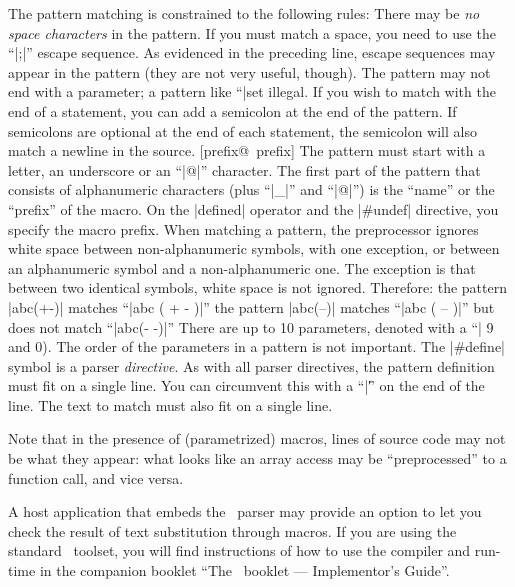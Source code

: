 The pattern matching is constrained to the following rules:
\beginlist{1em}\compactlist
\list{\lbullet}
  There may be {\it no space characters\/} in the pattern. If you must match a space,
  you need to use the ``|;|'' escape sequence.
\list{\lbullet}
  As evidenced in the preceding line, escape sequences may appear in the
  pattern (they are not very useful, though).
\list{\lbullet}
  The pattern may not end with a parameter; a pattern like ``|set %
  illegal. If you wish to match with the end of a statement, you can add a
  semicolon at the end of the pattern. If semicolons are optional at the end of
  each statement, the semicolon will also match a newline in the source.
\list{\lbullet}
  [prefix@\midtilde\ prefix] 
  The pattern must start with a letter, an underscore or an ``|@|'' character.
  The first part of the pattern that consists of alphanumeric characters (plus
  ``|_|'' and ``|@|'') is the ``name'' or the ``prefix'' of the macro. On the
  |defined| operator and the |#undef| directive, you specify the macro prefix.
\list{\lbullet}
  When matching a pattern, the preprocessor ignores white space between
  non-alphanumeric symbols, with one exception, or between an alphanumeric
  symbol and a non-alphanumeric one. The exception is that between two
  identical symbols, white space is not ignored. Therefore:
  \beginlist{1em}\compactlist
  \list{~}
        the pattern |abc(+-)| matches ``|abc ( + - )|''
  \list{~}
        the pattern |abc(--)| matches ``|abc ( -- )|'' but does not match ``|abc(- -)|''
  \endlist
\list{\lbullet}
  There are up to 10 parameters, denoted with a ``|%
  9 and 0). The order of the parameters in a pattern is not important.
\list{\lbullet}
  \noindent{}
   
  The |#define| symbol is a parser {\it directive\/}. As with all parser
  directives, the pattern definition must fit on a single line. You can
  circumvent this with a ``|\|'' on the end of the line.
  The text to match must also fit on a single line.
\endlist

Note that in the presence of (parametrized) macros, lines of source code may
not be what they appear: what looks like an array access may be ``preprocessed''
to a function call, and vice versa.

A host application that embeds the \Small\ parser may provide an option to
let you check the result of text substitution through macros.
If you are using the standard \Small\ toolset, you will find instructions of how
to use the compiler and run-time in the companion booklet ``The \Small\ booklet
--- Implementor's Guide''.


